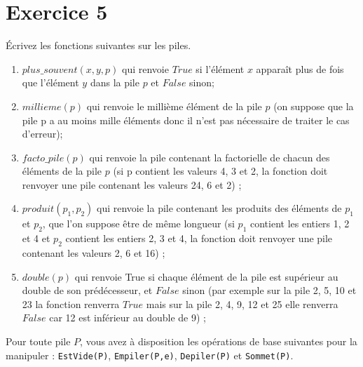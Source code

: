 \documentclass{article}[12pt]
\begin{document}
\section*{Exercice 5}
Écrivez les fonctions suivantes sur les piles.
\begin{enumerate}
    \item $plus\_souvent(x,y,p)$ qui renvoie $True$ si l’élément $x$ apparaît plus de fois que l’élément $y$ dans la pile $p$ et $False$ sinon;
    \item $millieme(p)$ qui renvoie le millième élément de la pile $p$ (on suppose que la pile p a au moins
mille éléments donc il n’est pas nécessaire de traiter le cas d’erreur);
    \item $facto\_pile(p)$ qui renvoie la pile contenant la factorielle de chacun des éléments de la pile $p$
(si p contient les valeurs 4, 3 et 2, la fonction doit renvoyer une pile contenant les valeurs 24, 6 et
2) ;
    \item $produit(p_1,p_2)$ qui renvoie la pile contenant les produits des éléments de $p_1$ et $p_2$, que l’on
suppose être de même longueur (si $p_1$ contient les entiers 1, 2 et 4 et $p_2$ contient les entiers 2, 3 et
4, la fonction doit renvoyer une pile contenant les valeurs 2, 6 et 16) ;
    \item $double(p)$ qui renvoie True si chaque élément de la pile est supérieur au double de son prédécesseur, et $False$ sinon (par exemple sur la pile 2, 5, 10 et 23 la fonction renverra $True$ mais sur la pile 2, 4, 9, 12 et 25 elle renverra $False$ car 12 est inférieur au double de 9) ;
\end{enumerate}
Pour toute pile $P$, vous avez à disposition les opérations de base suivantes pour la manipuler : \texttt{EstVide(P)},  \texttt{Empiler(P,e)}, \texttt{Depiler(P)} et \texttt{Sommet(P)}.
\end{document}
